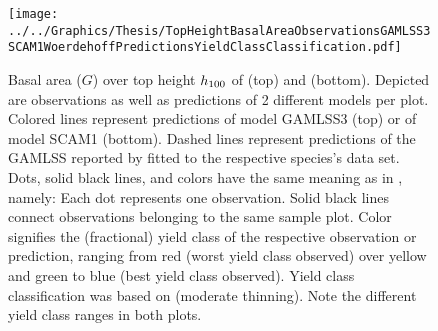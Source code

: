 \begin{figure}[h]
  \centering
  \texttt{[image: ../../Graphics/Thesis/TopHeightBasalAreaObservationsGAMLSS3SCAM1WoerdehoffPredictionsYieldClassClassification.pdf]}
  \caption{Basal area (\(G\)) over top height \(h_{100}{}\) of \Beech{} (top) and \Spruce{} (bottom). Depicted are observations as well as predictions of 2 different models per plot.  Colored lines represent predictions of model GAMLSS3 (top) or of model SCAM1 (bottom).  Dashed lines represent predictions of the GAMLSS reported by \textcite{Woerdehoff2016} fitted to the respective species’s data set.  Dots, solid black lines, and colors have the same meaning as in , namely:  Each dot represents one observation.  Solid black lines connect observations belonging to the same sample plot.  Color signifies the (fractional) yield class of the respective observation or prediction, ranging from red (worst yield class observed) over yellow and green to blue (best yield class observed).  Yield class classification was based on \textcite{Schober1995} (moderate thinning).  Note the different yield class ranges in both plots.}
  \label{fig:TopHeightBasalAreaObservationsGAMLSS3SCAM1WoerdehoffPredictionsYieldClassClassification}
\end{figure}


\clearpage{}

